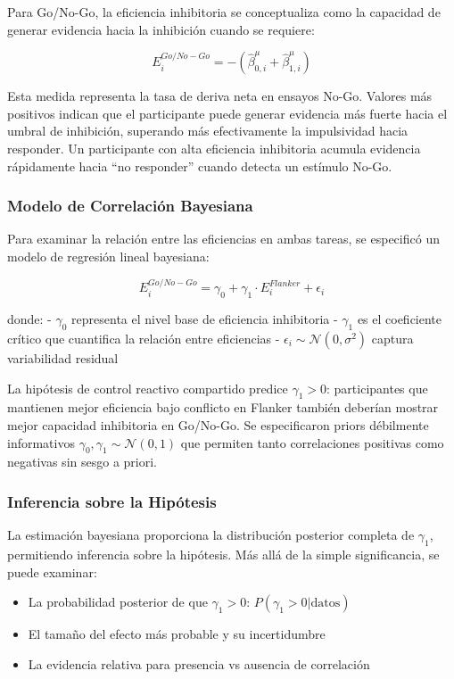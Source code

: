 \documentclass[
  spanish,
  10pt,
]{article}
\providecommand{\tightlist}{%
  \setlength{\itemsep}{0pt}\setlength{\parskip}{0pt}}
\begin{document}
Para Go/No-Go, la eficiencia inhibitoria se conceptualiza como la
capacidad de generar evidencia hacia la inhibición cuando se requiere:

\[E_i^{Go/No-Go} = -(\hat{\beta}_{0,i}^{\mu} + \hat{\beta}_{1,i}^{\mu})\]

Esta medida representa la tasa de deriva neta en ensayos No-Go. Valores
más positivos indican que el participante puede generar evidencia más
fuerte hacia el umbral de inhibición, superando más efectivamente la
impulsividad hacia responder. Un participante con alta eficiencia
inhibitoria acumula evidencia rápidamente hacia ``no responder'' cuando
detecta un estímulo No-Go.

\subsubsection{Modelo de Correlación
Bayesiana}\label{modelo-de-correlaciuxf3n-bayesiana}

Para examinar la relación entre las eficiencias en ambas tareas, se
especificó un modelo de regresión lineal bayesiana:

\[E_i^{Go/No-Go} = \gamma_0 + \gamma_1 \cdot E_i^{Flanker} + \epsilon_i\]

donde: - \(\gamma_0\) representa el nivel base de eficiencia inhibitoria
- \(\gamma_1\) es el coeficiente crítico que cuantifica la relación
entre eficiencias - \(\epsilon_i \sim \mathcal{N}(0, \sigma^2)\) captura
variabilidad residual

La hipótesis de control reactivo compartido predice \(\gamma_1 > 0\):
participantes que mantienen mejor eficiencia bajo conflicto en Flanker
también deberían mostrar mejor capacidad inhibitoria en Go/No-Go. Se
especificaron priors débilmente informativos
\(\gamma_0, \gamma_1 \sim \mathcal{N}(0, 1)\) que permiten tanto
correlaciones positivas como negativas sin sesgo a priori.

\subsubsection{Inferencia sobre la
Hipótesis}\label{inferencia-sobre-la-hipuxf3tesis}

La estimación bayesiana proporciona la distribución posterior completa
de \(\gamma_1\), permitiendo inferencia sobre la hipótesis. Más allá de
la simple significancia, se puede examinar:

\begin{itemize}
\tightlist
\item
  La probabilidad posterior de que \(\gamma_1 > 0\):
  \(P(\gamma_1 > 0 | \text{datos})\)
\item
  El tamaño del efecto más probable y su incertidumbre
\item
  La evidencia relativa para presencia vs ausencia de correlación
\end{itemize}
\end{document}
